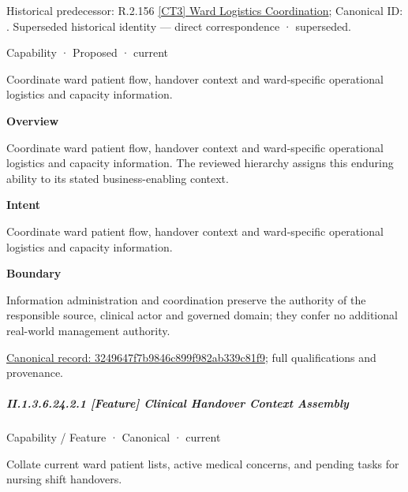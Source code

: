 {\small Historical predecessor: R.2.156 \hyperref[element:8a9dcc3b5f0143458ec71bc188a56020]{[CT3] Ward Logistics Coordination}; Canonical ID: \texttt{}. Superseded historical identity — direct correspondence · superseded.}\par
\label{element:3249647f7b9846c899f982ab339c81f9}
{\small Capability · Proposed · current}\par

Coordinate ward patient flow, handover context and ward-specific operational logistics and capacity information.



\textbf{Overview}



Coordinate ward patient flow, handover context and ward-specific operational logistics and capacity information. The reviewed hierarchy assigns this enduring ability to its stated business-enabling context.



\textbf{Intent}



Coordinate ward patient flow, handover context and ward-specific operational logistics and capacity information.



\textbf{Boundary}



Information administration and coordination preserve the authority of the responsible source, clinical actor and governed domain; they confer no additional real-world management authority.


{\footnotesize \href{../../../../../../../continuum/strategy/capability/3249647f7b9846c899f982ab339c81f9.md}{Canonical record: 3249647f7b9846c899f982ab339c81f9}; full qualifications and provenance.}\par
\subparagraph*{II.1.3.6.24.2.1 [Feature] Clinical Handover Context Assembly}
\label{navigation:II.1.3.6.24.2.1}

\label{element:f8c748aa08444723b784887174831d51}
{\small Capability / Feature · Canonical · current}\par

Collate current ward patient lists, active medical concerns, and pending tasks for nursing shift handovers.



